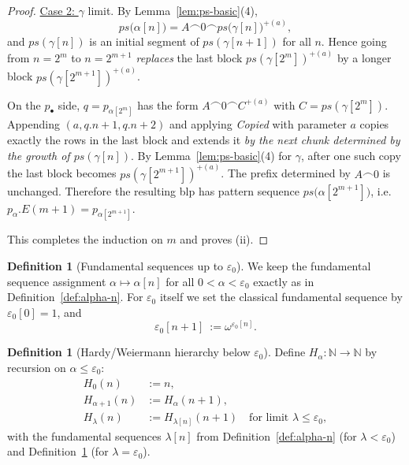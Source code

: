 \documentclass{article}
\theoremstyle{definition}
\newtheorem{definition}[lemma]{Definition}
\theoremstyle{remark}
\begin{document}
\begin{proof}
\underline{Case 2: } $\gamma$ limit.
By Lemma~\ref{lem:ps-basic}(4),
\[
ps\!\bigl(\alpha[n]\bigr)=A\frown 0 \frown ps\!\bigl(\gamma[n]\bigr)^{+(a)},
\]
and $ps(\gamma[n])$ is an initial segment of $ps(\gamma[n+1])$ for all $n$.
Hence going from $n=2^m$ to $n=2^{m+1}$ \emph{replaces} the last block
$ps(\gamma[2^m])^{+(a)}$ by a longer block $ps(\gamma[2^{m+1}])^{+(a)}$.

On the $p_\bullet$ side, $q=p_{\alpha[2^m]}$ has the form
\(
A\frown 0 \frown C^{+(a)}
\)
with $C=ps(\gamma[2^m])$. Appending $(a,q.n+1,q.n+2)$ and applying
\textit{Copied} with parameter $a$ copies exactly the rows in the last block and
extends it \emph{by the next chunk determined by the growth of $ps(\gamma[n])$}.
By Lemma~\ref{lem:ps-basic}(4) for $\gamma$, after one such copy the last block
becomes $ps(\gamma[2^{m+1}])^{+(a)}$. The prefix determined by $A\frown 0$ is
unchanged. Therefore the resulting blp has pattern sequence
$ps\!\bigl(\alpha[2^{m+1}]\bigr)$, i.e.\ $p_\alpha.E(m+1)=p_{\alpha[2^{m+1}]}$.

\smallskip
This completes the induction on $m$ and proves (ii).
\end{proof}


\begin{definition}[Fundamental sequences up to $\varepsilon_0$]\label{def:epsilon0-n}
We keep the fundamental sequence assignment $\alpha\mapsto \alpha[n]$ for all $0<\alpha<\varepsilon_0$ exactly as in Definition~\ref{def:alpha-n}. 
For $\varepsilon_0$ itself we set the classical fundamental sequence by $\varepsilon_0[0]=1$, and 
\[
\varepsilon_0[n+1]\ :=\omega^{\varepsilon_0[n]}.
\]
\end{definition}

\begin{definition}[Hardy/Weiermann hierarchy below $\varepsilon_0$]\label{def:Hardy}
Define $H_\alpha:\mathbb{N}\to\mathbb{N}$ by  recursion on $\alpha\le \varepsilon_0$:
\begin{align*}
H_0(n) &:= n,\\
H_{\alpha+1}(n) &:= H_\alpha(n+1),\\
H_\lambda(n) &:= H_{\lambda[n]}(n+1)\quad\text{for limit }\lambda\le \varepsilon_0,
\end{align*}
with the fundamental sequences $\lambda[n]$ from Definition~\ref{def:alpha-n} (for $\lambda<\varepsilon_0$) and Definition~\ref{def:epsilon0-n} (for $\lambda=\varepsilon_0$).
\end{definition}
\end{document}
